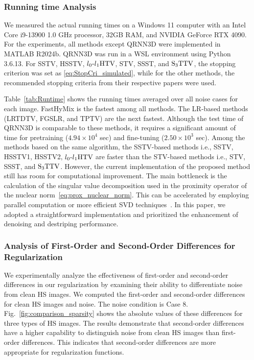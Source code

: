 \subsubsection{Running time Analysis}
We measured the actual running times on a Windows 11 computer with an Intel Core i9-13900 1.0 GHz processor, 32GB RAM, and NVIDIA GeForce RTX 4090. For the experiments, all methods except QRNN3D were implemented in MATLAB R2024b. QRNN3D was run in a WSL environment using Python 3.6.13. For SSTV, HSSTV, ${l_{0}\text{-}l_{1}\text{HTV}}$, STV, SSST, and ${\text{S}_{3} \text{TTV}}$, the stopping criterion was set as \eqref{eq:StopCri_simulated}, while for the other methods, the recommended stopping criteria from their respective papers were used.

Table~\ref{tab:Runtime} shows the running times averaged over all noise cases for each image. FastHyMix is the fastest among all methods. The LR-based methods (LRTDTV, FGSLR, and TPTV) are the next fastest. Although the test time of QRNN3D is comparable to these methods, it requires a significant amount of time for pretraining ($4.94 \times 10^{4}$ sec) and fine-tuning ($2.50 \times 10^{3}$ sec). Among the methods based on the same algorithm, the SSTV-based methods i.e., SSTV, HSSTV1, HSSTV2, ${l_{0}\text{-}l_{1}\text{HTV}}$ are faster than the STV-based methods i.e., STV, SSST, and ${\text{S}_{3} \text{TTV}}$. However, the current implementation of the proposed method still has room for computational improvement. The main bottleneck is the calculation of the singular value decomposition used in the proximity operator of the nuclear norm~\ref{eq:prox_nuclear_norm}. This can be accelerated by employing parallel computation or more efficient SVD techniques~\cite{Musco2015Randomized,Struski2024GPUSVD}. In this paper, we adopted a straightforward implementation and prioritized the enhancement of denoising and destriping performance.





\subsubsection{Analysis of First-Order and Second-Order Differences for Regularization}
\label{subsubsec:SparsityAnal}

We experimentally analyze the effectiveness of first-order and second-order differences in our regularization by examining their ability to differentiate noise from clean HS images.
We computed the first-order and second-order differences for clean HS images and noise. The noise condition is Case 8. Fig.~\ref{fig:comparison_sparsity} shows the absolute values of these differences for three types of HS images. The results demonstrate that second-order differences have a higher capability to distinguish noise from clean HS images than first-order differences. This indicates that second-order differences are more appropriate for regularization functions.




